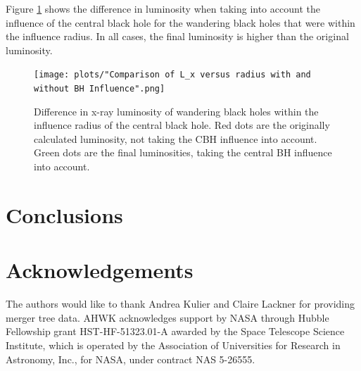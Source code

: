 \documentclass[english, apj]{emulateapj}
\begin{document}
Figure \ref{fig:wui} shows the difference in luminosity when taking into account the influence of the central black hole for the wandering black holes that were within the influence radius.  In all cases, the final luminosity is higher than the original luminosity.
\begin{figure}[H]
\begin{center}
\texttt{[image: plots/"Comparison of L\_x versus radius with and without BH Influence".png]}
\caption{Difference in x-ray luminosity of wandering black holes within the influence radius of the central black hole.  Red dots are the originally calculated luminosity, not taking the CBH influence into account.  Green dots are the final luminosities, taking the central BH influence into account.}
\label{fig:wui}
\end{center}
\end{figure}

\section{Conclusions}\label{sec:conclusions}

\section{Acknowledgements}
The authors would like to thank Andrea Kulier and Claire Lackner for providing merger tree data. AHWK acknowledges support by NASA through Hubble Fellowship grant HST-HF-51323.01-A awarded by the Space Telescope Science Institute, which is operated by the Association of Universities for Research in Astronomy, Inc., for NASA, under contract NAS 5-26555.








\end{document}
